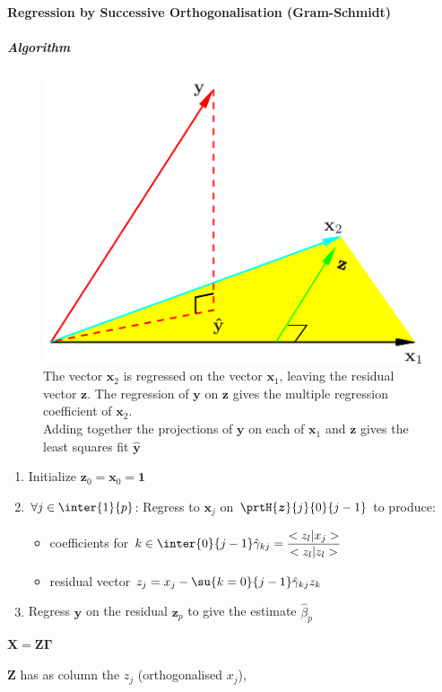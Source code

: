 \paragraph{Regression by Successive Orthogonalisation (Gram-Schmidt)}
\subparagraph{Algorithm}
\begin{figure}[H]
	\begin{center}
		\includegraphics[width=.5\textwidth]{./chap/1chap/2sec/2images/3_1regressionImage.png}
	\end{center}
	\caption{The vector $\bm{x}_{2}$ is regressed on the vector
	$\bm{x}_{1}$, leaving the residual vector $\bm{z}$. The 
	regression of $\bm{y}$ on $\bm{z}$ gives the multiple 
	regression coefficient of $\bm{x}_{2}$.\\
	Adding together the projections of $\bm{y}$ on each of 
	$\bm{x}_{1}$ and $\bm{z}$ gives the least squares fit 
	$\hat{\bm{y}}$}
	\label{fig:3.1regressionImage}
\end{figure}
\begin{enumerate}
	\item Initialize $\bm{z}_{0}=\bm{x}_{0}=\bm{1}$
	\item $\forall j\in\inter{1}{p}$:
		Regress to $\bm{x}_{j}$ on $\prtH{\bm{z}}{j}{0}{j-1}$
		to produce:
		\begin{itemize}
			\item coefficients for $k\in\inter{0}{j-1}
				\hat{\gamma}_{kj}=
				\dfrac{<z_{l}|x_{j}>}{<z_{l}|z_{l}>}$
			\item residual vector $z_{j}= x_{j}-\su{{k=0}}{j-1}\hat{\gamma}_{kj}z_{k}$
		\end{itemize} 
	\item Regress $\bm{y}$ on the residual $\bm{z}_{p}$ to give the
		estimate $\hat{\beta}_{p}$
\end{enumerate}
\begin{center}
$\bm{X} = \bm{Z}\bm{\Gamma}$
\end{center}
$\bm{Z}$ has as column the $z_{j}$ (orthogonalised $x_{j}$), 
